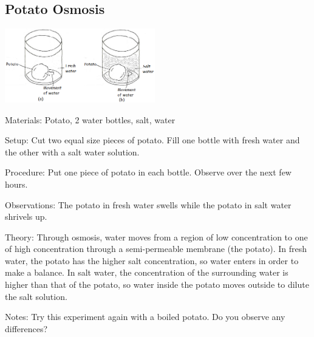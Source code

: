 \begin{multicols}{2}
\subsection{Potato Osmosis}

\begin{center}
\includegraphics[width=0.49\textwidth]{./img/vso/osmosis-potato-full.png}
\end{center}

\begin{description*}
\item[Materials:]{Potato, 2 water bottles, salt, water}
\item[Setup:]{Cut two equal size pieces of potato. Fill one bottle with fresh water and the other with a salt water solution.}
\item[Procedure:]{Put one piece of potato in each bottle. Observe over the next few hours.}
\item[Observations:]{The potato in fresh water swells while the potato in salt water shrivels up.}
\item[Theory:]{Through osmosis, water moves from a region of low concentration to one of high concentration through a semi-permeable membrane (the potato). In fresh water, the potato has the higher salt concentration, so water enters in order to make a balance. In salt water, the concentration of the surrounding water is higher than that of the potato, so water inside the potato moves outside to dilute the salt solution.}
\item[Notes:]{Try this experiment again with a boiled potato. Do you observe any differences?}
\end{description*}


\end{multicols}

\pagebreak